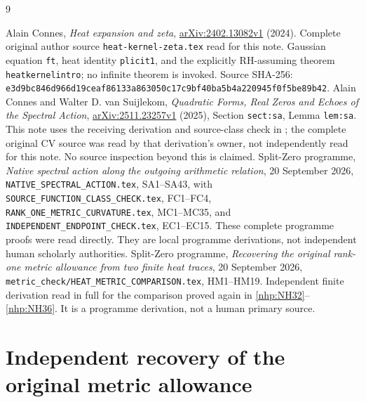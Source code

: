 \begin{thebibliography}{9}\raggedright
{}
Alain Connes, \emph{Heat expansion and zeta},
\href{https://arxiv.org/abs/2402.13082v1}{arXiv:2402.13082v1}
(2024). Complete original author source
\texttt{heat-kernel-zeta.tex} read for this note.
Gaussian equation \texttt{ft}, heat identity \texttt{plicit1},
and the explicitly RH-assuming theorem
\texttt{heatkernelintro}; no infinite theorem is invoked.
Source SHA-256:
\texttt{e3d9bc846d966d19ceaf86133a863050c17c9bf40ba5b4a220945f0f5be89b42}.
Alain Connes and Walter D. van Suijlekom,
\emph{Quadratic Forms, Real Zeros and Echoes of the Spectral Action},
\href{https://arxiv.org/abs/2511.23257v1}{arXiv:2511.23257v1}
(2025), Section \texttt{sect:sa}, Lemma \texttt{lem:sa}.
This note uses the receiving derivation and source-class
check in \cite{nhp:NativeAction}; the complete original CV
source was read by that derivation's owner, not independently
read for this note. No source inspection beyond this is claimed.
Split-Zero programme, \emph{Native spectral action along the
outgoing arithmetic relation}, 20 September 2026,
\texttt{NATIVE\_SPECTRAL\_ACTION.tex}, SA1--SA43, with
\texttt{SOURCE\_FUNCTION\_CLASS\_CHECK.tex}, FC1--FC4,
\texttt{RANK\_ONE\_METRIC\_CURVATURE.tex}, MC1--MC35, and
\texttt{INDEPENDENT\_ENDPOINT\_CHECK.tex}, EC1--EC15.
These complete programme proofs were read directly.
They are local programme derivations, not independent
human scholarly authorities.
Split-Zero programme, \emph{Recovering the original rank-one
metric allowance from two finite heat traces},
20 September 2026,
\texttt{metric\_check/HEAT\_METRIC\_COMPARISON.tex},
HM1--HM19. Independent finite derivation read in full
for the comparison proved again in \eqref{nhp:NH32}--\eqref{nhp:NH36}.
It is a programme derivation, not a human primary source.
\end{thebibliography}

\endgroup

\clearpage\begingroup
\part*{Independent recovery of the original metric allowance}
\newtheorem{nhmtheorem}{Theorem}
\newtheorem{nhmlemma}{Lemma}
\newcommand{\nhmtr}{\operatorname{tr}}
\newcommand{\nhmadj}{\dagger_G}
\newcommand{\nhmRea}{\operatorname{Re}}
\newcommand{\nhmIma}{\operatorname{Im}}



